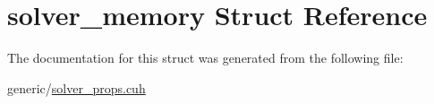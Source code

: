 \hypertarget{structsolver__memory}{}\section{solver\+\_\+memory Struct Reference}
\label{structsolver__memory}


The documentation for this struct was generated from the following file\+:\begin{DoxyCompactItemize}
\item 
generic/\hyperlink{solver__props_8cuh}{solver\+\_\+props.\+cuh}\end{DoxyCompactItemize}
